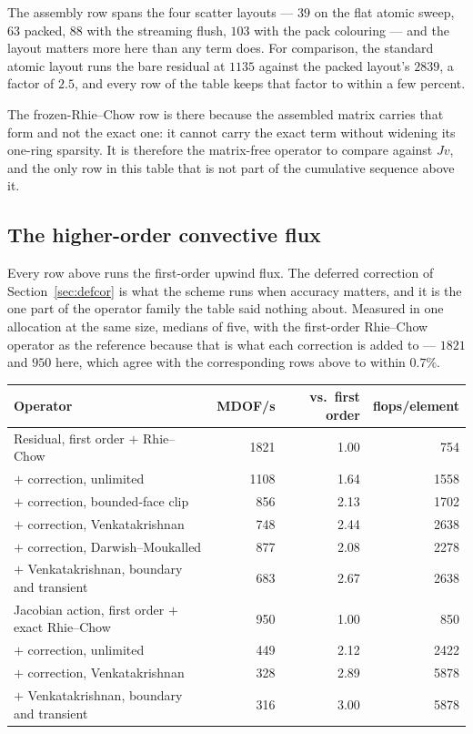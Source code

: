 \documentclass[11pt,a4paper]{article}
\begin{document}
The assembly row spans the four scatter layouts --- $39$ on the flat atomic sweep, $63$ packed,
$88$ with the streaming flush, $103$ with the pack colouring --- and the layout matters more
here than any term does. For comparison, the standard atomic layout runs the bare residual at
$1135$ against the packed layout's $2839$, a factor of $2.5$, and every row of the table keeps
that factor to within a few percent.

The frozen-Rhie--Chow row is there because the assembled matrix carries that form and not the
exact one: it cannot carry the exact term without widening its one-ring sparsity. It is
therefore the matrix-free operator to compare against $Jv$, and the only row in this table that
is not part of the cumulative sequence above it.

\subsection{The higher-order convective flux}

Every row above runs the first-order upwind flux. The deferred correction of
Section~\ref{sec:defcor} is what the scheme runs when accuracy matters, and it is the one part of
the operator family the table said nothing about. Measured in one allocation at the same size,
medians of five, with the first-order Rhie--Chow operator as the reference because that is what
each correction is added to --- $1821$ and $950$ here, which agree with the corresponding rows
above to within $0.7\%$.

\begin{center}
\begin{tabular}{lrrr}
\toprule
Operator & MDOF/s & vs.\ first order & flops/element \\
\midrule
Residual, first order $+$ Rhie--Chow                  & 1821 & 1.00 &  754 \\
\quad $+$ correction, unlimited                       & 1108 & 1.64 & 1558 \\
\quad $+$ correction, bounded-face clip               &  856 & 2.13 & 1702 \\
\quad $+$ correction, Venkatakrishnan                 &  748 & 2.44 & 2638 \\
\quad $+$ correction, Darwish--Moukalled              &  877 & 2.08 & 2278 \\
\quad $+$ Venkatakrishnan, boundary and transient     &  683 & 2.67 & 2638 \\
\midrule
Jacobian action, first order $+$ exact Rhie--Chow     &  950 & 1.00 &  850 \\
\quad $+$ correction, unlimited                       &  449 & 2.12 & 2422 \\
\quad $+$ correction, Venkatakrishnan                 &  328 & 2.89 & 5878 \\
\quad $+$ Venkatakrishnan, boundary and transient     &  316 & 3.00 & 5878 \\
\bottomrule
\end{tabular}
\end{center}
\end{document}
